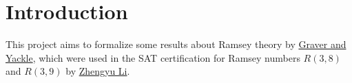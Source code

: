 \chapter{Introduction}

This project aims to formalize some results about Ramsey theory by \href{https://www.sciencedirect.com/science/article/pii/S0021980068800389}{Graver and Yackle}, which were used in the SAT certification for Ramsey numbers $R(3,8)$ and $R(3,9)$ by \href{https://www.ijcai.org/proceedings/2025/0292.pdf}{Zhengyu Li}.
